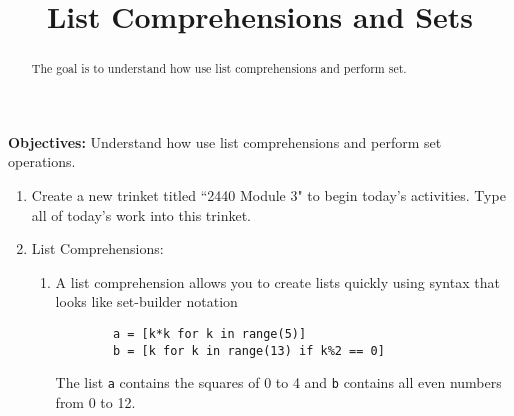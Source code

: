 \documentclass{ximera}
\title{List Comprehensions and Sets}
\begin{document}
\begin{abstract}
The goal is to understand how use list comprehensions and perform set.
\end{abstract}
\maketitle

\noindent\textbf{Objectives: }Understand how use list comprehensions and perform set operations.

\begin{enumerate}
\item Create a new trinket titled ``2440 Module 3" to begin today's activities. Type all of today's work into this trinket.
\item List Comprehensions:
    \begin{enumerate}
        \item A list comprehension allows you to create lists quickly using syntax that looks like set-builder notation
        \begin{verbatim}
        a = [k*k for k in range(5)]
        b = [k for k in range(13) if k%2 == 0]
        \end{verbatim}
        The list \verb|a| contains the squares of 0 to 4 and \verb|b| contains all even numbers from 0 to 12.
    \end{enumerate}


\end{enumerate}
\end{document}
